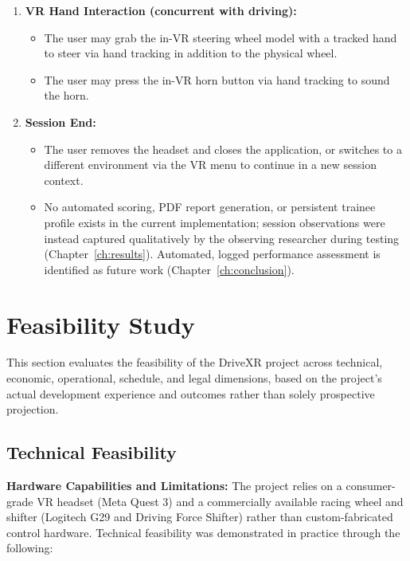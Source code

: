 \begin{enumerate}
    \item \textbf{VR Hand Interaction (concurrent with driving):}
    \begin{itemize}
        \item The user may grab the in-VR steering wheel model with a tracked hand to steer via hand tracking in addition to the physical wheel.
        \item The user may press the in-VR horn button via hand tracking to sound the horn.
    \end{itemize}

    \item \textbf{Session End:}
    \begin{itemize}
        \item The user removes the headset and closes the application, or switches to a different environment via the VR menu to continue in a new session context.
        \item No automated scoring, PDF report generation, or persistent trainee profile exists in the current implementation; session observations were instead captured qualitatively by the observing researcher during testing (Chapter~\ref{ch:results}). Automated, logged performance assessment is identified as future work (Chapter~\ref{ch:conclusion}).
    \end{itemize}
\end{enumerate}

\section{Feasibility Study}

This section evaluates the feasibility of the DriveXR project across technical, economic, operational, schedule, and legal dimensions, based on the project's actual development experience and outcomes rather than solely prospective projection.

\subsection{Technical Feasibility}

\textbf{Hardware Capabilities and Limitations:}
The project relies on a consumer-grade VR headset (Meta Quest 3) and a commercially available racing wheel and shifter (Logitech G29 and Driving Force Shifter) rather than custom-fabricated control hardware. Technical feasibility was demonstrated in practice through the following:

